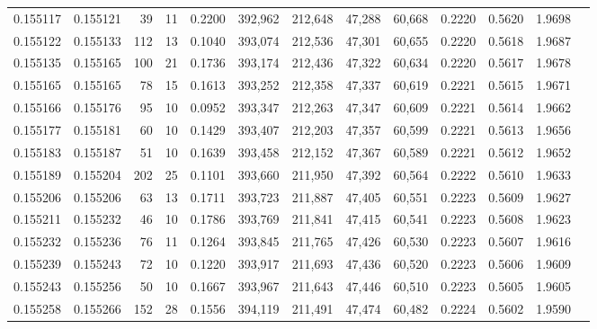 \begin{tabular}{rrrrrrrrrrrrr}
0.155117 & 0.155121 &    39 &  11 &                                     0.2200 & 392,962 & 212,648 &  47,288 &  60,668 & 0.2220 & 0.5620 & 1.9698 \\
0.155122 & 0.155133 &   112 &  13 &                                     0.1040 & 393,074 & 212,536 &  47,301 &  60,655 & 0.2220 & 0.5618 & 1.9687 \\
0.155135 & 0.155165 &   100 &  21 &                                     0.1736 & 393,174 & 212,436 &  47,322 &  60,634 & 0.2220 & 0.5617 & 1.9678 \\
0.155165 & 0.155165 &    78 &  15 &                                     0.1613 & 393,252 & 212,358 &  47,337 &  60,619 & 0.2221 & 0.5615 & 1.9671 \\
0.155166 & 0.155176 &    95 &  10 &                                     0.0952 & 393,347 & 212,263 &  47,347 &  60,609 & 0.2221 & 0.5614 & 1.9662 \\
0.155177 & 0.155181 &    60 &  10 &                                     0.1429 & 393,407 & 212,203 &  47,357 &  60,599 & 0.2221 & 0.5613 & 1.9656 \\
0.155183 & 0.155187 &    51 &  10 &                                     0.1639 & 393,458 & 212,152 &  47,367 &  60,589 & 0.2221 & 0.5612 & 1.9652 \\
0.155189 & 0.155204 &   202 &  25 &                                     0.1101 & 393,660 & 211,950 &  47,392 &  60,564 & 0.2222 & 0.5610 & 1.9633 \\
0.155206 & 0.155206 &    63 &  13 &                                     0.1711 & 393,723 & 211,887 &  47,405 &  60,551 & 0.2223 & 0.5609 & 1.9627 \\
0.155211 & 0.155232 &    46 &  10 &                                     0.1786 & 393,769 & 211,841 &  47,415 &  60,541 & 0.2223 & 0.5608 & 1.9623 \\
0.155232 & 0.155236 &    76 &  11 &                                     0.1264 & 393,845 & 211,765 &  47,426 &  60,530 & 0.2223 & 0.5607 & 1.9616 \\
0.155239 & 0.155243 &    72 &  10 &                                     0.1220 & 393,917 & 211,693 &  47,436 &  60,520 & 0.2223 & 0.5606 & 1.9609 \\
0.155243 & 0.155256 &    50 &  10 &                                     0.1667 & 393,967 & 211,643 &  47,446 &  60,510 & 0.2223 & 0.5605 & 1.9605 \\
0.155258 & 0.155266 &   152 &  28 &                                     0.1556 & 394,119 & 211,491 &  47,474 &  60,482 & 0.2224 & 0.5602 & 1.9590 \\

\end{tabular}
